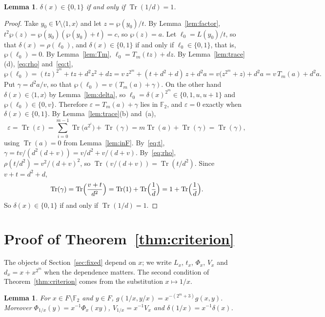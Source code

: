 \documentclass[11pt,a4paper,reqno]{amsart}
\newtheorem{lemma}[theorem]{Lemma}
\theoremstyle{remark}
\numberwithin{equation}{section}
\newcommand{\F}{\mathbb{F}}
\newcommand{\Tr}{\operatorname{Tr}}
\begin{document}
\begin{lemma}\label{lem:first}
$\delta(x)\in\{0,1\}$ if and only if $\Tr(1/d)=1$.
\end{lemma}

\begin{proof}
Take $y_0\in V\setminus\langle1,x\rangle$ and let $z=\wp(y_0)/t$. By Lemma~\ref{lem:factor}, $t^2\wp(z)=\wp(y_0)(\wp(y_0)+t)=c$, so $\wp(z)=a$. Let $\ell_0=L(y_0)/t$, so that $\delta(x)=\rho(\ell_0)$, and $\delta(x)\in\{0,1\}$ if and only if $\ell_0\in\{0,1\}$, that is, $\wp(\ell_0)=0$. By Lemma~\ref{lem:Tm}, $\ell_0=T_m(tz)+dz$. By Lemma~\ref{lem:trace}(d), \eqref{eq:rho} and~\eqref{eq:t},
\[
\wp(\ell_0)=(tz)^{2^m}+tz+d^2z^2+dz=v\,z^{2^m}+(t+d^2+d)\,z+d^2a=v\bigl(z^{2^m}+z\bigr)+d^2a=v\,T_m(a)+d^2a .
\]
Put $\gamma=d^2a/v$, so that $\wp(\ell_0)=v\,(T_m(a)+\gamma)$. On the other hand $\delta(x)\in\langle1,x\rangle$ by Lemma~\ref{lem:delta}, so $\ell_0=\delta(x)^{2^m}\in\{0,1,u,u+1\}$ and $\wp(\ell_0)\in\{0,v\}$. Therefore $\varepsilon=T_m(a)+\gamma$ lies in $\F_2$, and $\varepsilon=0$ exactly when $\delta(x)\in\{0,1\}$. By Lemma~\ref{lem:trace}(b) and~(a),
\[
\varepsilon=\Tr(\varepsilon)=\sum_{i=0}^{m-1}\Tr\bigl(a^{2^i}\bigr)+\Tr(\gamma)=m\Tr(a)+\Tr(\gamma)=\Tr(\gamma),
\]
using $\Tr(a)=0$ from Lemma~\ref{lem:inF}. By~\eqref{eq:t}, $\gamma=tv/(d^2(d+v))=v/d^2+v/(d+v)$. By~\eqref{eq:rho}, $\rho(t/d^2)=v^2/(d+v)^2$, so $\Tr(v/(d+v))=\Tr(t/d^2)$. Since $v+t=d^2+d$,
\[
\Tr(\gamma)=\Tr\Bigl(\frac{v+t}{d^2}\Bigr)=\Tr(1)+\Tr\Bigl(\frac1d\Bigr)=1+\Tr\Bigl(\frac1d\Bigr).
\]
So $\delta(x)\in\{0,1\}$ if and only if $\Tr(1/d)=1$.
\end{proof}

\section{Proof of Theorem~\ref{thm:criterion}}\label{sec:criterion}

The objects of Section~\ref{sec:fixed} depend on $x$; we write $L_x$, $t_x$, $\Phi_x$, $V_x$ and $d_x=x+x^{2^m}$ when the dependence matters. The second condition of Theorem~\ref{thm:criterion} comes from the substitution $x\mapsto 1/x$.

\begin{lemma}\label{lem:inverse}
For $x\in F\setminus\F_2$ and $y\in F$, $g(1/x,y/x)=x^{-(2^m+3)}g(x,y)$. Moreover $\Phi_{1/x}(y)=x^{-1}\Phi_x(xy)$, $V_{1/x}=x^{-1}V_x$ and $\delta(1/x)=x^{-1}\delta(x)$.
\end{lemma}
\end{document}
